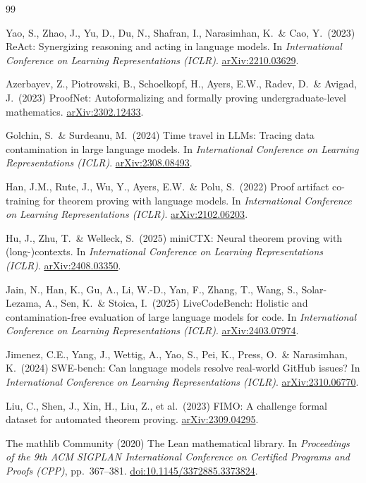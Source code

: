 \documentclass{article}
\newcommand{\doi}[1]{\href{https://doi.org/#1}{doi:#1}}
\newcommand{\arxiv}[1]{\href{https://arxiv.org/abs/#1}{arXiv:#1}}
\begin{document}
\medskip
{
\small

\begin{thebibliography}{99}

Yao, S., Zhao, J., Yu, D., Du, N., Shafran, I., Narasimhan, K.\ \& Cao, Y.\ (2023)
{ReAct}: Synergizing reasoning and acting in language models. In {\it International
Conference on Learning Representations (ICLR)}. \arxiv{2210.03629}.

Azerbayev, Z., Piotrowski, B., Schoelkopf, H., Ayers, E.W., Radev, D.\ \& Avigad, J.\ (2023)
ProofNet: Autoformalizing and formally proving undergraduate-level mathematics.
\arxiv{2302.12433}.

Golchin, S.\ \& Surdeanu, M.\ (2024) Time travel in LLMs: Tracing data contamination in large
language models. In {\it International Conference on Learning Representations (ICLR)}.
\arxiv{2308.08493}.

Han, J.M., Rute, J., Wu, Y., Ayers, E.W.\ \& Polu, S.\ (2022) Proof artifact co-training for
theorem proving with language models. In {\it International Conference on Learning
Representations (ICLR)}. \arxiv{2102.06203}.

Hu, J., Zhu, T.\ \& Welleck, S.\ (2025) miniCTX: Neural theorem proving with (long-)contexts.
In {\it International Conference on Learning Representations (ICLR)}.
\arxiv{2408.03350}.

Jain, N., Han, K., Gu, A., Li, W.-D., Yan, F., Zhang, T., Wang, S., Solar-Lezama, A., Sen, K.\ \&
Stoica, I.\ (2025) LiveCodeBench: Holistic and contamination-free evaluation of large language
models for code. In {\it International Conference on Learning Representations (ICLR)}.
\arxiv{2403.07974}.

Jimenez, C.E., Yang, J., Wettig, A., Yao, S., Pei, K., Press, O.\ \& Narasimhan, K.\ (2024)
SWE-bench: Can language models resolve real-world GitHub issues? In {\it International Conference
on Learning Representations (ICLR)}. \arxiv{2310.06770}.

Liu, C., Shen, J., Xin, H., Liu, Z., et al.\ (2023) FIMO: A challenge formal dataset for
automated theorem proving. \arxiv{2309.04295}.

The mathlib Community (2020) The Lean mathematical library. In {\it Proceedings of the 9th ACM
SIGPLAN International Conference on Certified Programs and Proofs (CPP)}, pp.\ 367--381.
\doi{10.1145/3372885.3373824}.


\end{thebibliography}}
\end{document}
